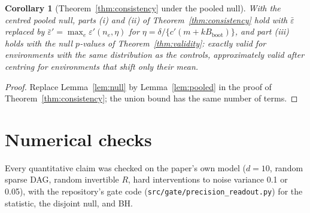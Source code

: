 \documentclass[11pt]{article}
\newtheorem{corollary}{Corollary}
\theoremstyle{remark}
\newcommand{\Bb}{B_{\mathrm{boot}}}
\begin{document}
\begin{corollary}[Theorem~\ref{thm:consistency} under the pooled null]
\label{cor:pooled}
With the centred pooled null, parts (i) and (ii) of Theorem~\ref{thm:consistency} hold with $\bar\varepsilon$ replaced by $\bar\varepsilon'=\max_e\varepsilon'(n_e,\eta)$ for $\eta=\delta/\{c'(m+k\Bb)\}$, and part (iii) holds with the null $p$-values of Theorem~\ref{thm:validity}: exactly valid for environments with the same distribution as the controls, approximately valid after centring for environments that shift only their mean.
\end{corollary}

\begin{proof}
Replace Lemma~\ref{lem:null} by Lemma~\ref{lem:pooled} in the proof of Theorem~\ref{thm:consistency}; the union bound has the same number of terms.
\end{proof}

\section{Numerical checks}
\label{sec:checks}

Every quantitative claim was checked on the paper's own model ($d=10$, random sparse DAG, random invertible $R$, hard interventions to noise variance 0.1 or 0.05), with the repository's gate code (\texttt{src/gate/precision\_readout.py}) for the statistic, the disjoint null, and BH.
\end{document}

